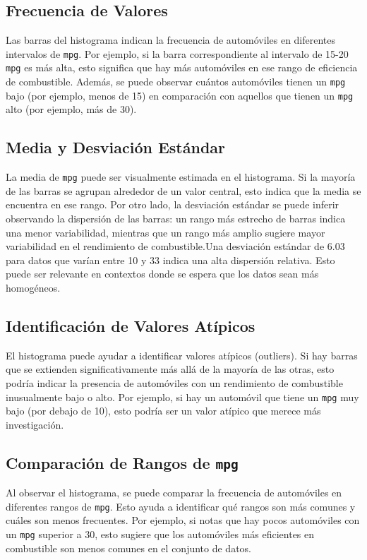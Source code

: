 \documentclass{article}
\begin{document}
\subsection{Frecuencia de Valores}
Las barras del histograma indican la frecuencia de automóviles en diferentes intervalos de \texttt{mpg}. Por ejemplo, si la barra correspondiente al intervalo de 15-20 \texttt{mpg} es más alta, esto significa que hay más automóviles en ese rango de eficiencia de combustible. Además, se puede observar cuántos automóviles tienen un \texttt{mpg} bajo (por ejemplo, menos de 15) en comparación con aquellos que tienen un \texttt{mpg} alto (por ejemplo, más de 30).

\subsection{Media y Desviación Estándar}
La media de \texttt{mpg} puede ser visualmente estimada en el histograma. Si la mayoría de las barras se agrupan alrededor de un valor central, esto indica que la media se encuentra en ese rango. Por otro lado, la desviación estándar se puede inferir observando la dispersión de las barras: un rango más estrecho de barras indica una menor variabilidad, mientras que un rango más amplio sugiere mayor variabilidad en el rendimiento de combustible.Una desviación estándar de 6.03 para datos que varían entre 10 y 33 indica una alta dispersión relativa. Esto puede ser relevante en contextos donde se espera que los datos sean más homogéneos.

\subsection{Identificación de Valores Atípicos}
El histograma puede ayudar a identificar valores atípicos (outliers). Si hay barras que se extienden significativamente más allá de la mayoría de las otras, esto podría indicar la presencia de automóviles con un rendimiento de combustible inusualmente bajo o alto. Por ejemplo, si hay un automóvil que tiene un \texttt{mpg} muy bajo (por debajo de 10), esto podría ser un valor atípico que merece más investigación.

\subsection{Comparación de Rangos de \texttt{mpg}}
Al observar el histograma, se puede comparar la frecuencia de automóviles en diferentes rangos de \texttt{mpg}. Esto ayuda a identificar qué rangos son más comunes y cuáles son menos frecuentes. Por ejemplo, si notas que hay pocos automóviles con un \texttt{mpg} superior a 30, esto sugiere que los automóviles más eficientes en combustible son menos comunes en el conjunto de datos.
\end{document}
